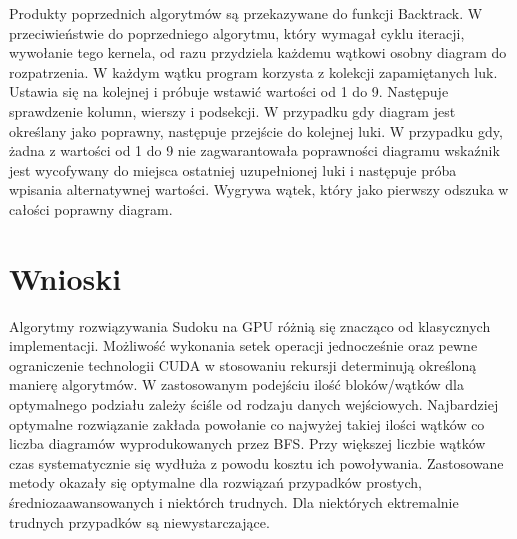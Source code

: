 \documentclass[a4paper,12pt]{article}
\begin{document}
Produkty poprzednich algorytmów są przekazywane do funkcji Backtrack.  W przeciwieństwie do poprzedniego algorytmu, który wymagał cyklu iteracji, wywołanie tego kernela, od razu przydziela każdemu wątkowi osobny diagram do rozpatrzenia. W każdym wątku program korzysta z kolekcji zapamiętanych luk. Ustawia się na kolejnej i próbuje wstawić wartości od 1 do 9. Następuje sprawdzenie kolumn, wierszy i podsekcji. W przypadku gdy diagram jest określany jako poprawny, następuje przejście do kolejnej luki. W przypadku gdy, żadna z wartości od 1 do 9 nie zagwarantowała poprawności diagramu wskaźnik jest wycofywany do miejsca ostatniej uzupełnionej luki i następuje próba wpisania alternatywnej wartości. Wygrywa wątek, który jako pierwszy odszuka w całości poprawny diagram. 

\section{Wnioski}

Algorytmy rozwiązywania Sudoku na GPU różnią się znacząco od klasycznych implementacji. Możliwość wykonania setek operacji jednocześnie oraz pewne ograniczenie technologii CUDA w stosowaniu rekursji determinują określoną manierę algorytmów. W zastosowanym podejściu ilość bloków/wątków dla optymalnego podziału zależy ściśle od rodzaju danych wejściowych. Najbardziej optymalne rozwiązanie zakłada powołanie co najwyżej takiej ilości wątków co liczba diagramów wyprodukowanych przez BFS. Przy większej liczbie wątków czas systematycznie się wydłuża z powodu kosztu ich powoływania. Zastosowane metody okazały się optymalne dla rozwiązań przypadków prostych, średniozaawansowanych i niektórch trudnych. Dla niektórych ektremalnie trudnych przypadków są niewystarczające.
\end{document}
